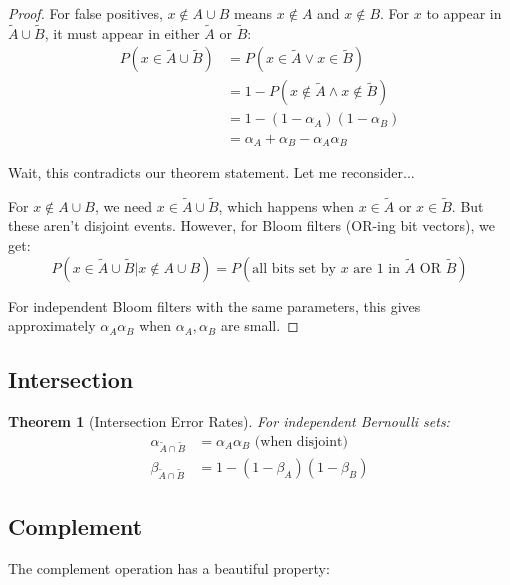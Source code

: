 \documentclass[11pt,twoside,openright]{book}
\theoremstyle{definition}
\theoremstyle{plain}
\newtheorem{theorem}[definition]{Theorem}
\theoremstyle{remark}
\begin{document}
\begin{proof}
For false positives, $x \notin A \cup B$ means $x \notin A$ and $x \notin B$. For $x$ to appear in $\tilde{A} \cup \tilde{B}$, it must appear in either $\tilde{A}$ or $\tilde{B}$:
\begin{align}
P(x \in \tilde{A} \cup \tilde{B}) &= P(x \in \tilde{A} \vee x \in \tilde{B}) \\
&= 1 - P(x \notin \tilde{A} \wedge x \notin \tilde{B}) \\
&= 1 - (1 - \alpha_A)(1 - \alpha_B) \\
&= \alpha_A + \alpha_B - \alpha_A \alpha_B
\end{align}

Wait, this contradicts our theorem statement. Let me reconsider...

For $x \notin A \cup B$, we need $x \in \tilde{A} \cup \tilde{B}$, which happens when $x \in \tilde{A}$ or $x \in \tilde{B}$. But these aren't disjoint events. However, for Bloom filters (OR-ing bit vectors), we get:
\begin{equation}
P(x \in \tilde{A} \cup \tilde{B} | x \notin A \cup B) = P(\text{all bits set by } x \text{ are 1 in } \tilde{A} \text{ OR } \tilde{B})
\end{equation}

For independent Bloom filters with the same parameters, this gives approximately $\alpha_A \alpha_B$ when $\alpha_A, \alpha_B$ are small.
\end{proof}

\subsection{Intersection}

\begin{theorem}[Intersection Error Rates]
For independent Bernoulli sets:
\begin{align}
\alpha_{\tilde{A} \cap \tilde{B}} &= \alpha_A \alpha_B \text{ (when disjoint)} \\
\beta_{\tilde{A} \cap \tilde{B}} &= 1 - (1 - \beta_A)(1 - \beta_B)
\end{align}
\end{theorem}

\subsection{Complement}

The complement operation has a beautiful property:
\end{document}
